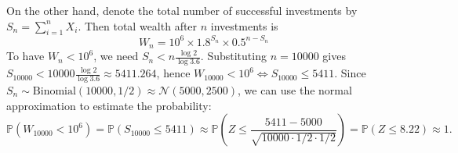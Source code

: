 \documentclass[11pt]{article}
\begin{document}
\begin{problem}[20]
\begin{solution}
  On the other hand, denote the total number of successful investments by $S_n = \sum_{i=1}^n X_i$. Then total wealth after $n$ investments is
  \[
    W_n = 10^6 \times 1.8^{S_n} \times 0.5^{n-S_n} 
    \]
  To have $W_n < 10^6$, we need $S_n < n \frac{\log 2}{\log 3.6}$. Substituting $n=10000$ gives $S_{10000} < 10000 \frac{\log 2}{\log 3.6} \approx 5411.264$, hence $W_{10000} < 10^6 \iff S_{10000} \leq 5411$. Since $S_n \sim \text{Binomial}(10000, 1/2) \approx \mathcal{N}(5000, 2500)$, we can use the normal approximation to estimate the probability:
  \[
    \mathbb{P}(W_{10000} < 10^6) = \mathbb{P}(S_{10000} \leq 5411) \approx \mathbb{P}\left(Z \leq \frac{5411 - 5000}{\sqrt{10000 \cdot 1/2 \cdot 1/2}} \right)
    = \mathbb{P}(Z \leq 8.22) \approx 1.
  \]


\end{solution}

\end{problem}
\end{document}
